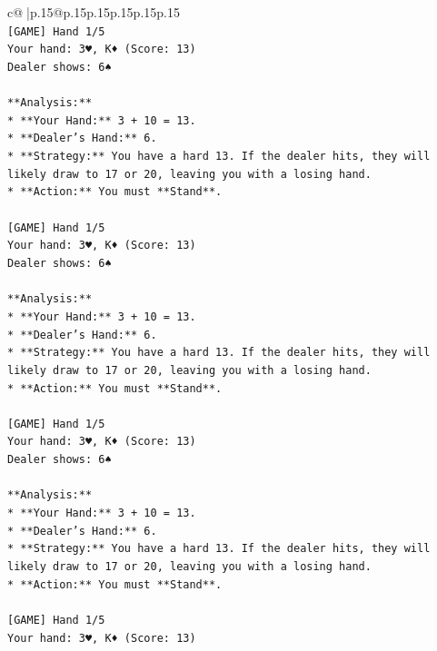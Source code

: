 \documentclass{article}
\begin{document}
{\begin{supertabular}{c@{$\;$}|p{.15\linewidth}@{}p{.15\linewidth}p{.15\linewidth}p{.15\linewidth}p{.15\linewidth}p{.15\linewidth}}
{{{\\ 
\texttt{{[}GAME{]} Hand 1/5} \\
\texttt{Your hand: 3♥, K♦ (Score: 13)} \\
\texttt{Dealer shows: 6♠} \\
\\ 
\texttt{**Analysis:**} \\
\texttt{*   **Your Hand:** 3 + 10 = 13.} \\
\texttt{*   **Dealer's Hand:** 6.} \\
\texttt{*   **Strategy:** You have a hard 13. If the dealer hits, they will likely draw to 17 or 20, leaving you with a losing hand.} \\
\texttt{*   **Action:** You must **Stand**.} \\
\\ 
\texttt{{[}GAME{]} Hand 1/5} \\
\texttt{Your hand: 3♥, K♦ (Score: 13)} \\
\texttt{Dealer shows: 6♠} \\
\\ 
\texttt{**Analysis:**} \\
\texttt{*   **Your Hand:** 3 + 10 = 13.} \\
\texttt{*   **Dealer's Hand:** 6.} \\
\texttt{*   **Strategy:** You have a hard 13. If the dealer hits, they will likely draw to 17 or 20, leaving you with a losing hand.} \\
\texttt{*   **Action:** You must **Stand**.} \\
\\ 
\texttt{{[}GAME{]} Hand 1/5} \\
\texttt{Your hand: 3♥, K♦ (Score: 13)} \\
\texttt{Dealer shows: 6♠} \\
\\ 
\texttt{**Analysis:**} \\
\texttt{*   **Your Hand:** 3 + 10 = 13.} \\
\texttt{*   **Dealer's Hand:** 6.} \\
\texttt{*   **Strategy:** You have a hard 13. If the dealer hits, they will likely draw to 17 or 20, leaving you with a losing hand.} \\
\texttt{*   **Action:** You must **Stand**.} \\
\\ 
\texttt{{[}GAME{]} Hand 1/5} \\
\texttt{Your hand: 3♥, K♦ (Score: 13)} \\
}}}
\end{supertabular}}
\end{document}

